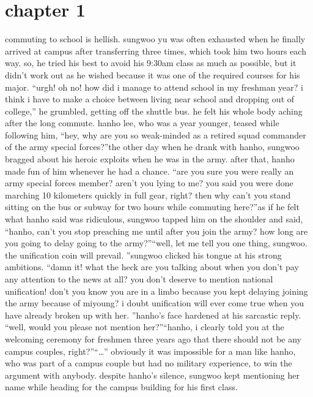 \section{chapter 1}






commuting to school is hellish.
sungwoo yu was often exhausted when he finally arrived at campus after transferring three times, which took him two hours each way.
so, he tried his best to avoid his 9:30am class as much as possible, but it didn’t work out as he wished because it was one of the required courses for his major.
“urgh! oh no! how did i manage to attend school in my freshman year? i think i have to make a choice between living near school and dropping out of college,” he grumbled, getting off the shuttle bus.
 he felt his whole body aching after the long commute.
hanho lee, who was a year younger, teased while following him, “hey, why are you so weak-minded as a retired squad commander of the army special forces?”the other day when he drank with hanho, sungwoo bragged about his heroic exploits when he was in the army.
 after that, hanho made fun of him whenever he had a chance.
“are you sure you were really an army special forces member? aren’t you lying to me? you said you were done marching 10 kilometers quickly in full gear, right? then why can’t you stand sitting on the bus or subway for two hours while commuting here?”as if he felt what hanho said was ridiculous, sungwoo tapped him on the shoulder and said, “hanho, can’t you stop preaching me until after you join the army? how long are you going to delay going to the army?”“well, let me tell you one thing, sungwoo.
 the unification coin will prevail.
”sungwoo clicked his tongue at his strong ambitions.
“damn it! what the heck are you talking about when you don’t pay any attention to the news at all? you don’t deserve to mention national unification! don’t you know you are in a limbo because you kept delaying joining the army because of miyoung? i doubt unification will ever come true when you have already broken up with her.
”hanho’s face hardened at his sarcastic reply.
“well, would you please not mention her?”“hanho, i clearly told you at the welcoming ceremony for freshmen three years ago that there should not be any campus couples, right?”“…”
obviously it was impossible for a man like hanho, who was part of a campus couple but had no military experience, to win the argument with anybody.
despite hanho’s silence, sungwoo kept mentioning her name while heading for the campus building for his first class.
